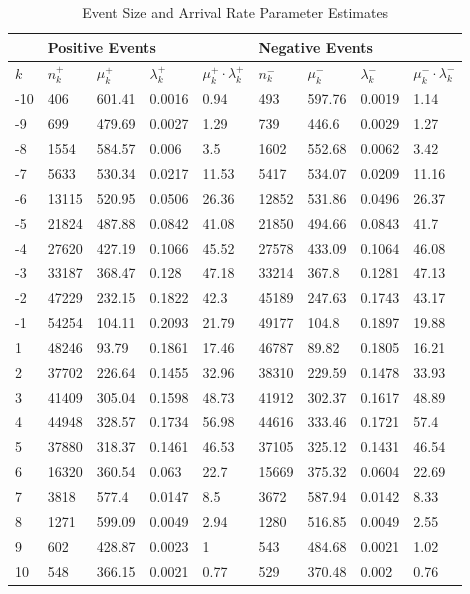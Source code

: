 \begin{table}[htbp]
\caption{Event Size and Arrival Rate Parameter Estimates} \label{tab:parameters}
\begin{center}
\begin{tabular}{l|llll|llll}
\hline \hline
 & \multicolumn{4}{l|}{\textbf{Positive Events}} & \multicolumn{4}{l}{\textbf{Negative Events}} \\
\hline
$k$   & $n_k^+$ & $\mu^+_k$ & $\lambda^+_k$ & $\mu^+_k \cdot \lambda^+_k$ & $n_k^-$  & $\mu^-_k$  & $\lambda^-_k$ & $\mu^-_k \cdot \lambda^-_k$  \\
\hline
-10 & 406   & 601.41 & 0.0016 & 0.94      & 493   & 597.76 & 0.0019 & 1.14       \\
-9  & 699   & 479.69 & 0.0027 & 1.29      & 739   & 446.6  & 0.0029 & 1.27       \\
-8  & 1554  & 584.57 & 0.006  & 3.5       & 1602  & 552.68 & 0.0062 & 3.42       \\
-7  & 5633  & 530.34 & 0.0217 & 11.53     & 5417  & 534.07 & 0.0209 & 11.16      \\
-6  & 13115 & 520.95 & 0.0506 & 26.36     & 12852 & 531.86 & 0.0496 & 26.37      \\
-5  & 21824 & 487.88 & 0.0842 & 41.08     & 21850 & 494.66 & 0.0843 & 41.7       \\
-4  & 27620 & 427.19 & 0.1066 & 45.52     & 27578 & 433.09 & 0.1064 & 46.08      \\
-3  & 33187 & 368.47 & 0.128  & 47.18     & 33214 & 367.8  & 0.1281 & 47.13      \\
-2  & 47229 & 232.15 & 0.1822 & 42.3      & 45189 & 247.63 & 0.1743 & 43.17      \\
-1  & 54254 & 104.11 & 0.2093 & 21.79     & 49177 & 104.8  & 0.1897 & 19.88      \\
1   & 48246 & 93.79  & 0.1861 & 17.46     & 46787 & 89.82  & 0.1805 & 16.21      \\
2   & 37702 & 226.64 & 0.1455 & 32.96     & 38310 & 229.59 & 0.1478 & 33.93      \\
3   & 41409 & 305.04 & 0.1598 & 48.73     & 41912 & 302.37 & 0.1617 & 48.89      \\
4   & 44948 & 328.57 & 0.1734 & 56.98     & 44616 & 333.46 & 0.1721 & 57.4       \\
5   & 37880 & 318.37 & 0.1461 & 46.53     & 37105 & 325.12 & 0.1431 & 46.54      \\
6   & 16320 & 360.54 & 0.063  & 22.7      & 15669 & 375.32 & 0.0604 & 22.69      \\
7   & 3818  & 577.4  & 0.0147 & 8.5       & 3672  & 587.94 & 0.0142 & 8.33       \\
8   & 1271  & 599.09 & 0.0049 & 2.94      & 1280  & 516.85 & 0.0049 & 2.55       \\
9   & 602   & 428.87 & 0.0023 & 1         & 543   & 484.68 & 0.0021 & 1.02       \\
10  & 548   & 366.15 & 0.0021 & 0.77      & 529   & 370.48 & 0.002  & 0.76      
\end{tabular}
\end{center}
\end{table}

